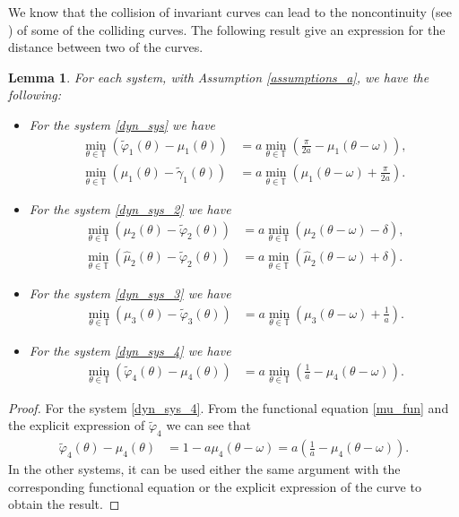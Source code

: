 \documentclass[12pt]{article}
\newcommand{\T}{\mathbb{T}}
\theoremstyle{plain}
\newtheorem{lemma}[defn]{Lemma}
\theoremstyle{remark}
\theoremstyle{definition}
\begin{document}
We know that the collision of invariant curves can lead to the noncontinuity (see \cite{keller1996sna,jorba2024nonsmooth}) of some of the colliding curves. The following result give an expression for the distance between two of the curves.
\begin{lemma}\label{lemma_distance}
    For each system, with Assumption \eqref{assumptions_a}, we have the following:
    \begin{itemize}
        \item For the system \eqref{dyn_sys} we have 
        \begin{align*}
            \min_{\theta\in\T}\left(\tilde\varphi_1(\theta)-\mu_1(\theta)\right)&=a\min_{\theta\in\T}\left(\frac{\pi}{2a}-\mu_1(\theta-\omega)\right),\\
            \min_{\theta\in\T}\left(\mu_1(\theta)-\tilde\gamma_1(\theta)\right)&=a\min_{\theta\in\T}\left(\mu_1(\theta-\omega)+\frac{\pi}{2a}\right).
        \end{align*}
        \item For the system \eqref{dyn_sys_2} we have
        \begin{align*}
            \min_{\theta\in\T}\left(\mu_2(\theta)-\tilde\varphi_2(\theta)\right)&=a\min_{\theta\in\T}\left(\mu_2(\theta-\omega)-\delta\right),\\
            \min_{\theta\in\T}\left(\hat\mu_2(\theta)-\tilde\varphi_2(\theta)\right)&=a\min_{\theta\in\T}\left(\hat\mu_2(\theta-\omega)+\delta\right).
        \end{align*}
        \item For the system \eqref{dyn_sys_3} we have
        \begin{align*}
            \min_{\theta\in\T}\left(\mu_3(\theta)-\tilde\varphi_3(\theta)\right)&=a\min_{\theta\in\T}\left(\mu_3(\theta-\omega)+\frac{1}{a}\right).
        \end{align*}
        \item For the system \eqref{dyn_sys_4} we have
        \begin{align*}
            \min_{\theta\in\T}\left(\tilde\varphi_4(\theta)-\mu_4(\theta)\right)&=a\min_{\theta\in\T}\left(\frac{1}{a}-\mu_4(\theta-\omega)\right).
        \end{align*}
    \end{itemize}
\end{lemma}
\begin{proof}
    For the system \eqref{dyn_sys_4}. From the functional equation \eqref{mu_fun} and the explicit expression of $\tilde\varphi_4$ we can see that
     \begin{align*}
        \tilde\varphi_4(\theta)-\mu_4(\theta)&=1-a\mu_4(\theta-\omega) = a\left(\frac{1}{a}-\mu_4(\theta-\omega)\right). 
    \end{align*}
    In the other systems, it can be used either the same argument with the corresponding functional equation or the explicit expression of the curve to obtain the result.
\end{proof}
\end{document}

